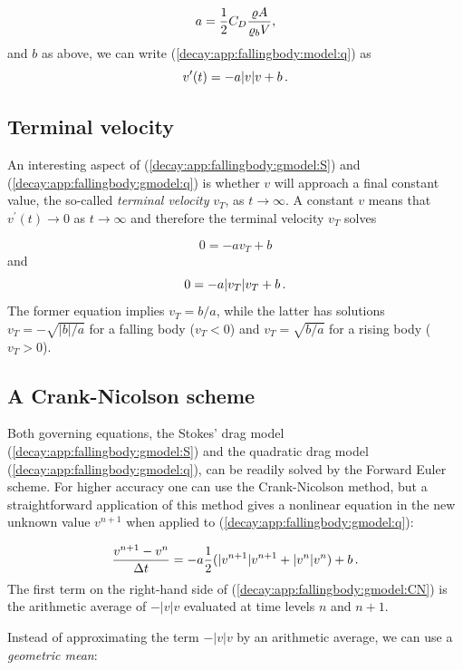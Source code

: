 \documentclass[%
oneside,                 %
final,                   %
10pt]{article}
\begin{document}
\begin{equation}
a = {1\over2}C_D{\varrho A\over\varrho_b V},
\end{equation}
and $b$ as above, we can write (\ref{decay:app:fallingbody:model:q}) as
\begin{equation}
v^{\prime}(t) = -a|v|v + b
\tp
\label{decay:app:fallingbody:gmodel:q}
\end{equation}


\subsection{Terminal velocity}

An interesting aspect of (\ref{decay:app:fallingbody:gmodel:S}) and
(\ref{decay:app:fallingbody:gmodel:q}) is whether $v$ will approach
a final constant value,
the so-called \emph{terminal velocity} $v_T$, as $t\rightarrow\infty$.
A constant $v$ means that
$v^{\prime}(t)\rightarrow 0$ as $t\rightarrow\infty$ and therefore
the terminal velocity $v_T$ solves

\[ 0 = -av_T + b \]
and
\[ 0 = -a|v_T|v_T + b\tp \]
The former equation implies $v_T = b/a$, while the latter has solutions
$v_T =-\sqrt{|b|/a}$ for a falling body ($v_T < 0$) and
$v_T = \sqrt{b/a}$ for a rising body ($v_T>0$).

\subsection{A Crank-Nicolson scheme}

Both governing equations, the Stokes' drag model
(\ref{decay:app:fallingbody:gmodel:S}) and the quadratic drag model
(\ref{decay:app:fallingbody:gmodel:q}), can be readily solved
by the Forward Euler scheme. For higher accuracy one can use
the Crank-Nicolson method, but a straightforward application
of this method gives
a nonlinear equation in the new unknown value $v^{n+1}$ when applied to
(\ref{decay:app:fallingbody:gmodel:q}):

\begin{equation}
\frac{v^{n+1}-v^n}{\Delta t}
= -a\half(|v^{n+1}|v^{n+1} + |v^n|v^n) + b
\label{decay:app:fallingbody:gmodel:CN}
\tp
\end{equation}
The first term on the right-hand side of (\ref{decay:app:fallingbody:gmodel:CN})
is the arithmetic average of $-|v|v$ evaluated at time levels $n$ and $n+1$.

Instead of approximating the term $-|v|v$ by an arithmetic
average, we can use a \emph{geometric mean}:
\end{document}

